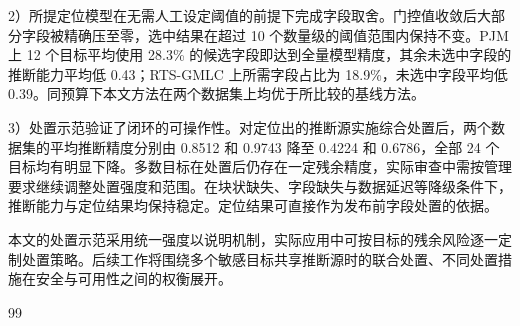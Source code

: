 \documentclass[UTF8,zihao=5,twoside,fontset=none]{ctexart}
\begin{document}
2）所提定位模型在无需人工设定阈值的前提下完成字段取舍。门控值收敛后大部分字段被精确压至零，选中结果在超过 10 个数量级的阈值范围内保持不变。PJM 上 12 个目标平均使用 28.3\% 的候选字段即达到全量模型精度，其余未选中字段的推断能力平均低 0.43；RTS-GMLC 上所需字段占比为 18.9\%，未选中字段平均低 0.39。同预算下本文方法在两个数据集上均优于所比较的基线方法。

3）处置示范验证了闭环的可操作性。对定位出的推断源实施综合处置后，两个数据集的平均推断精度分别由 0.8512 和 0.9743 降至 0.4224 和 0.6786，全部 24 个目标均有明显下降。多数目标在处置后仍存在一定残余精度，实际审查中需按管理要求继续调整处置强度和范围。在块状缺失、字段缺失与数据延迟等降级条件下，推断能力与定位结果均保持稳定。定位结果可直接作为发布前字段处置的依据。

本文的处置示范采用统一强度以说明机制，实际应用中可按目标的残余风险逐一定制处置策略。后续工作将围绕多个敏感目标共享推断源时的联合处置、不同处置措施在安全与可用性之间的权衡展开。

\begin{thebibliography}{99}
\setlength{\itemsep}{0.15ex}\setlength{\parskip}{0pt}

\end{thebibliography}

\vspace{0.6em}
\end{document}

